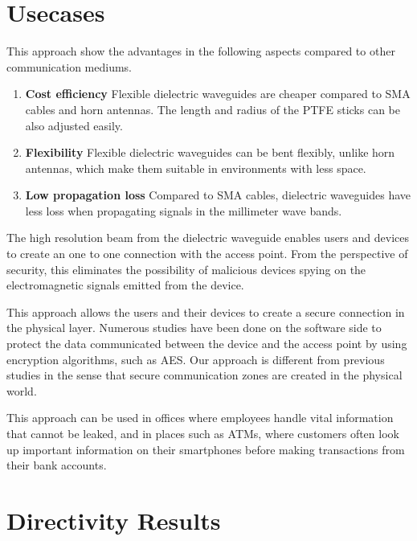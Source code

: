 \documentclass[a4paper,11pt]{jsarticle}
\renewcommand{\bibname}{References}
\begin{document}
\section{Usecases}

This approach show the advantages in the following aspects compared to
other communication mediums.

\begin{enumerate}
  \item \textbf{Cost efficiency} Flexible
  dielectric waveguides are cheaper compared to SMA cables and horn antennas.
  The length and radius of the PTFE sticks can be also adjusted easily.
  \item \textbf{Flexibility} Flexible dielectric waveguides can be bent
  flexibly, unlike horn antennas, which make them suitable in environments
  with less space.
  \item \textbf{Low propagation loss} Compared to SMA cables, dielectric waveguides
  have less loss when propagating signals in the millimeter wave bands.
\end{enumerate}

The high resolution beam from the dielectric waveguide
enables users and devices to create an one to one
connection with the access point.
From the perspective of security, this eliminates the possibility of
malicious devices spying on the electromagnetic signals emitted from the device.

This approach allows the users and their devices to create a
secure connection in the physical layer.
Numerous studies have been done on the software side to protect the
data communicated between the device and the access point by using
encryption algorithms, such as AES.
Our approach is different from previous studies
in the sense that secure communication zones are created in the physical world.

This approach can be used in offices where employees handle
vital information that cannot be leaked, and in places such as ATMs,
where customers often look up important information on their
smartphones before making transactions from their bank accounts.


\section{Directivity Results}

\newpage
\addcontentsline{toc}{chapter}{\bibname}

\end{document}
